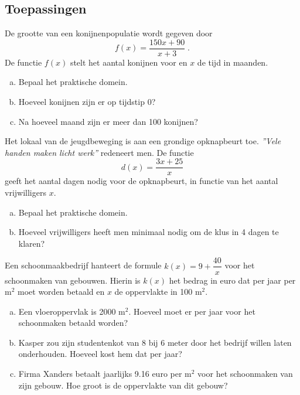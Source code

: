 \documentclass[12pt,twoside,a4paper]{article}
\begin{document}
\needspace{3cm}
\subsection{Toepassingen}

\begin{oefening}
De grootte van een konijnenpopulatie wordt gegeven door
$$f(x)=\dfrac{150x+90}{x+3}\;.$$
De functie $f(x)$ stelt het aantal konijnen voor en $x$ de tijd in maanden.
\begin{enumerate}[(a)]
  \item Bepaal het praktische domein.
  \item Hoeveel konijnen zijn er op tijdstip 0?
  \item Na hoeveel maand zijn er meer dan 100 konijnen?
\end{enumerate}
\end{oefening}

\begin{oefening}
Het lokaal van de jeugdbeweging is aan een grondige opknapbeurt toe. {\em ''Vele handen maken licht werk''} redeneert men. De functie
$$d(x)=\dfrac{3x+25}{x}$$
geeft het aantal dagen nodig voor de opknapbeurt, in functie van het aantal vrijwilligers $x$.
\begin{enumerate}[(a)]
  \item Bepaal het praktische domein.
  \item Hoeveel vrijwilligers heeft men minimaal nodig om de klus in 4 dagen te klaren?
\end{enumerate}
\end{oefening}

\begin{oefening}
Een schoonmaakbedrijf hanteert de formule $k(x)=9+\dfrac{40}{x}$ voor het schoonmaken van gebouwen. Hierin is $k(x)$ het bedrag in euro dat per jaar per m$^2$ moet worden betaald en $x$ de oppervlakte in 100 m$^2$.
\begin{enumerate}[(a)]
  \item Een vloeroppervlak is 2000 m$^2$. Hoeveel moet er per jaar voor het schoonmaken betaald worden?
  \item Kasper zou zijn studentenkot van 8 bij 6 meter door het bedrijf willen laten onderhouden. Hoeveel kost hem dat per jaar?
  \item Firma Xanders betaalt jaarlijks 9.16 euro per m$^2$ voor het schoonmaken van zijn gebouw. Hoe groot is de oppervlakte van dit gebouw?
\end{enumerate}
\end{oefening}
\end{document}
